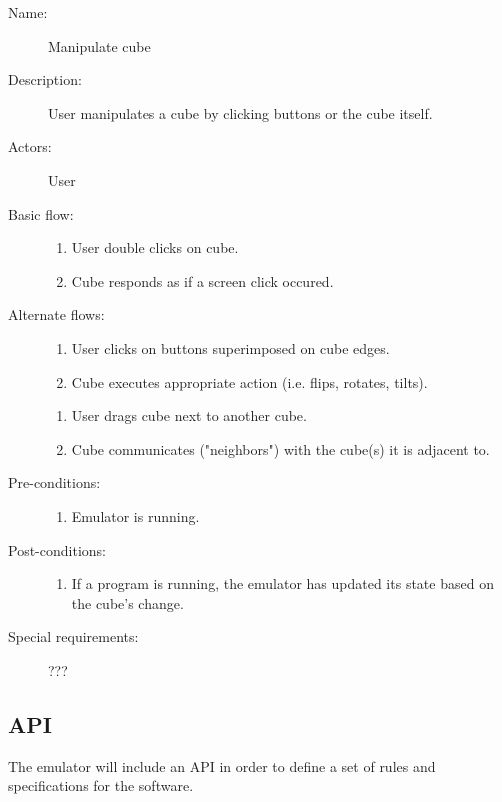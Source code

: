 \documentclass[12pt]{article}
\begin{document}
    \begin{description}
      \item[Name:] Manipulate cube
      \item[Description:] User manipulates a cube by clicking buttons or the cube itself.
      \item[Actors:] User
      \item[Basic flow:] \hfill
        \begin{enumerate}
	  \item{User double clicks on cube.}
	  \item{Cube responds as if a screen click occured.}
        \end{enumerate}
      \item[Alternate flows:] \hfill
        \begin{enumerate}
	  \item{User clicks on buttons superimposed on cube edges.}
	  \item{Cube executes appropriate action (i.e. flips, rotates, tilts).}
        \end{enumerate}
        \begin{enumerate}
          \item{User drags cube next to another cube.}
	  \item{Cube communicates ("neighbors") with the cube(s) it is adjacent to.}
        \end{enumerate}
      \item[Pre-conditions:] \hfill
        \begin{enumerate}
          \item{Emulator is running.}
        \end{enumerate}
      \item[Post-conditions:] \hfill
        \begin{enumerate}
	  \item{If a program is running, the emulator has updated its state based on the cube's change.}
        \end{enumerate}
      \item[Special requirements:] ???
    \end{description}

  \subsection{API}
    The emulator will include an API in order to define a set of rules and specifications for the software.
\end{document}
